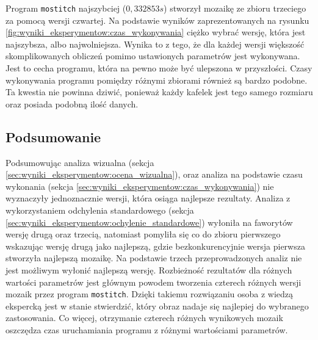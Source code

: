 Program \texttt{mostitch} najszybciej ($0,332853s$) stworzył mozaikę ze zbioru trzeciego za pomocą wersji czwartej. Na podstawie wyników zaprezentowanych na rysunku \ref{fig:wyniki_eksperymentow:czas_wykonywania} ciężko wybrać wersję, która jest najszybsza, albo najwolniejsza. Wynika to z tego, że dla każdej wersji większość skomplikowanych obliczeń pomimo ustawionych parametrów jest wykonywana. Jest to cecha programu, która na pewno może być ulepszona w przyszłości. Czasy wykonywania programu pomiędzy różnymi zbiorami również są bardzo podobne. Ta kwestia nie powinna dziwić, ponieważ każdy kafelek jest tego samego rozmiaru oraz posiada podobną ilość danych. 

\subsection{Podsumowanie}
\label{sec:wyniki_eksperymentow:podsumowanie}

Podsumowując analiza wizualna (sekcja \ref{sec:wyniki_eksperymentow:ocena_wizualna}), oraz analiza na podstawie czasu wykonania (sekcja \ref{sec:wyniki_eksperymentow:czas_wykonywania}) nie wyznaczyły jednoznacznie wersji, która osiąga najlepsze rezultaty. Analiza z wykorzystaniem odchylenia standardowego (sekcja \ref{sec:wyniki_eksperymentow:ochylenie_standardowe}) wyłoniła na faworytów wersję drugą oraz trzecią, natomiast pomyliła się co do zbioru pierwszego wskazując wersję drugą jako najlepszą, gdzie bezkonkurencyjnie wersja pierwsza stworzyła najlepszą mozaikę. Na podstawie trzech przeprowadzonych analiz nie jest możliwym wyłonić najlepszą wersję. Rozbieżność rezultatów dla różnych wartości parametrów jest głównym powodem tworzenia czterech różnych wersji mozaik przez program \texttt{mostitch}. Dzięki takiemu rozwiązaniu osoba z wiedzą ekspercką jest w stanie stwierdzić, który obraz nadaje się najlepiej do wybranego zastosowania. Co więcej, otrzymanie czterech różnych wynikowych mozaik oszczędza czas uruchamiania programu z różnymi wartościami parametrów.













